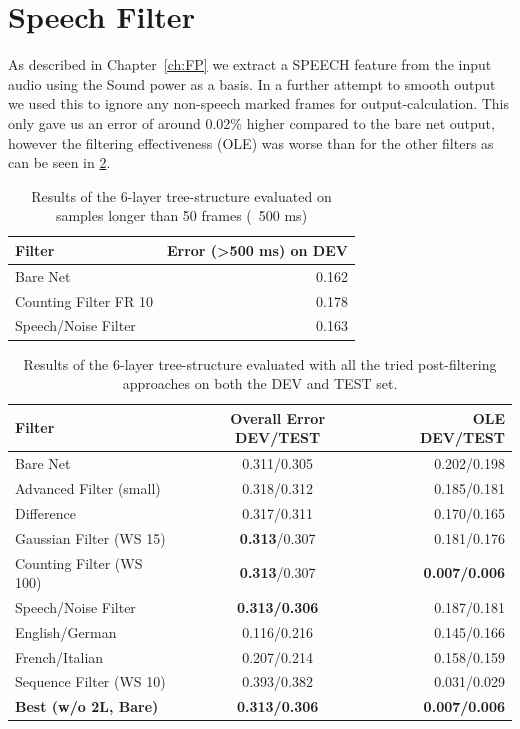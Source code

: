\section{Speech Filter}
\label{sec:speech}

As described in Chapter~\ref{ch:FP} we extract a SPEECH feature from the input audio using the Sound power as a basis. In a further attempt to smooth output we used this to ignore any non-speech marked frames for output-calculation. This only gave us an error of around 0.02\% higher compared to the bare net output, however the filtering effectiveness (OLE) was worse than for the other filters as can be seen in \ref{tab:evalTotal}. 

\begin{table}[h!]
\caption{Results of the 6-layer tree-structure evaluated on samples longer than 50 frames (~500 ms)}
\label{tab:evalTotal2}
\centering
\begin{tabular}{| l | r |}
	\hline
	\textbf{Filter} & \textbf{Error (>500 ms) on DEV}  \\
	\hline
	 Bare Net & 0.162 \\
	\hline
	Counting Filter FR 10 & 0.178\\
	\hline
	Speech/Noise Filter & 0.163\\
	\hline
\end{tabular}
\end{table}


\begin{table}[h!]
\centering
\caption{Results of the 6-layer tree-structure evaluated with all the tried post-filtering approaches on both the DEV and TEST set.}
\label{tab:evalTotal}
\begin{tabular}{| l | c | r |}
	\hline
	\textbf{Filter} & \textbf{Overall Error DEV/TEST} & \textbf{OLE DEV/TEST} \\
	\hline
	Bare Net & 0.311/0.305 & 0.202/0.198 \\
	\hline
	Advanced Filter (small) & 0.318/0.312 & 0.185/0.181 \\
	\hline
	Difference & 0.317/0.311 & 0.170/0.165 \\
	\hline
	Gaussian Filter (WS 15) & \textbf{0.313}/0.307  & 0.181/0.176 \\
	\hline
	Counting Filter (WS 100) & \textbf{0.313}/0.307 & \textbf{0.007/0.006} \\
	\hline
	Speech/Noise Filter  & \textbf{0.313/0.306} & 0.187/0.181 \\
	\hline
	English/German &  0.116/0.216 & 0.145/0.166 \\
	\hline
	French/Italian & 0.207/0.214 &  0.158/0.159 \\
	\hline
	Sequence Filter (WS 10) & 0.393/0.382 & 0.031/0.029 \\
	\hline
	\textbf{Best (w/o 2L, Bare)} & \textbf{0.313/0.306} & \textbf{0.007/0.006} \\
	\hline
\end{tabular}

\end{table}

